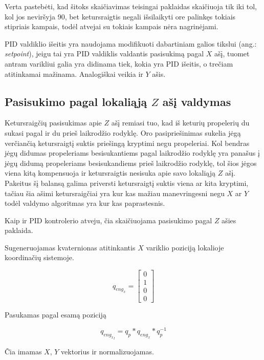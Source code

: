 \documentclass[12pt, a4paper, lithuanian, final]{article}
\begin{document}
Verta pastebėti, kad šitoks skaičiavimas teisingai paklaidas skaičiuoja tik iki tol, kol jos neviršyja 90\degree, bet ketursraigtis negali išsilaikyti ore palinkęs tokiais stipriais kampais, todėl atvejai su tokiais kampais nėra nagrinėjami.

PID valdiklio išeitis yra naudojama modifikuoti dabartiniam galios tikslui (ang.: \textit{setpoint}), jeigu tai yra PID valdiklis valdantis pasisukimą pagal $X$ ašį, tuomet antram varikliui galia yra didinama tiek, kokia yra PID išeitis, o trečiam atitinkamai mažinama.
Analogiškai veikia ir $Y$ ašis.

\subsection{Pasisukimo pagal lokaliąją $Z$ ašį valdymas}

Ketursraigčių pasisukimas apie $Z$ ašį remiasi tuo, kad iš keturių propelerių du sukasi pagal ir du prieš laikrodžio rodyklę.
Oro pasipriešinimas sukelia jėgą verčiančią ketursraigtį suktis priešingą kryptimi negu propeleriai.
Kol bendras jėgų didumas propeleriams besisukantiems pagal laikrodžio rodyklę yra panašus į jėgų didumą propeleriams besisukandiems prieš laikrodžio rodyklę, tol šios jėgos viena kitą kompensuoja ir ketursraigtis nesisuka apie savo lokaliąją $Z$ ašį.
Pakeitus šį balansą galima priversti ketursraigtį suktis viena ar kita kryptimi, tačiau šia ašimi ketursraigčiai yra kur kas mažiau manevringesni negu $X$ ar $Y$ todėl valdymo algoritmas yra kur kas paprastesnis.

Kaip ir PID kontrolerio atveju, čia skaičiuojama pasisukimo pagal $Z$ ašies paklaida.

Sugeneruojamas kvaternionas atitinkantis $X$ variklio poziciją lokalioje koordinačių sistemoje.

\begin{equation}
	q_{eng_x} = \left[
		\begin{array}{c}
			0 \\
			1 \\
			0 \\
			0
		\end{array}
	\right]
\end{equation}

Pasukamas pagal esamą poziciją

\begin{equation}
	q_{{eng_x}_l} = q_p * q_{eng_x} * q_p^{-1}
\end{equation}

Čia imamas $X$, $Y$ vektorius ir normalizuojamas.
\end{document}

